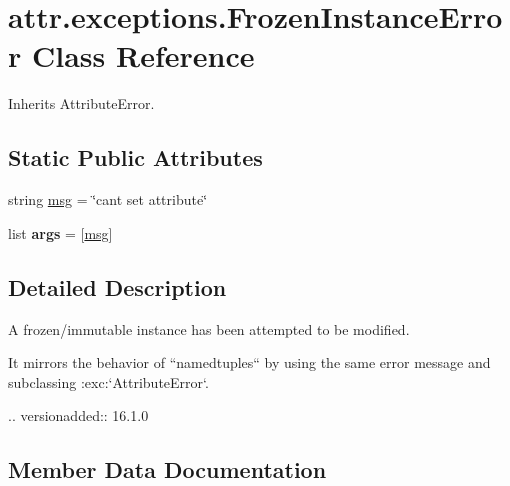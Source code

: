 \hypertarget{classattr_1_1exceptions_1_1_frozen_instance_error}{}\section{attr.\+exceptions.\+Frozen\+Instance\+Error Class Reference}
\label{classattr_1_1exceptions_1_1_frozen_instance_error}


Inherits Attribute\+Error.

\subsection*{Static Public Attributes}
\begin{DoxyCompactItemize}
\item 
string \hyperlink{classattr_1_1exceptions_1_1_frozen_instance_error_a2665749dc3223ed9430d4355f0c49fca}{msg} = \char`\"{}can\textquotesingle{}t set attribute\char`\"{}
\item 
\mbox{\label{classattr_1_1exceptions_1_1_frozen_instance_error_a9b137fcd13bf5517def60fe7dc7aa7c4}} 
list {\bfseries args} = \mbox{[}\hyperlink{classattr_1_1exceptions_1_1_frozen_instance_error_a2665749dc3223ed9430d4355f0c49fca}{msg}\mbox{]}
\end{DoxyCompactItemize}


\subsection{Detailed Description}
\begin{DoxyVerb}A frozen/immutable instance has been attempted to be modified.

It mirrors the behavior of ``namedtuples`` by using the same error message
and subclassing :exc:`AttributeError`.

.. versionadded:: 16.1.0
\end{DoxyVerb}
 

\subsection{Member Data Documentation}
\mbox{\label{classattr_1_1exceptions_1_1_frozen_instance_error_a2665749dc3223ed9430d4355f0c49fca}} 
